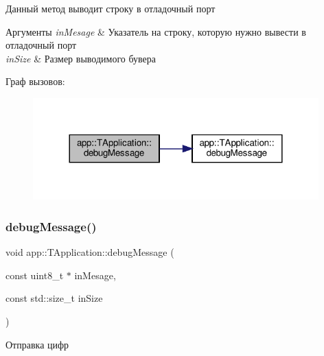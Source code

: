 Данный метод выводит строку в отладочный порт 
\begin{DoxyParams}{Аргументы}
{\em in\+Mesage} & Указатель на строку, которую нужно вывести в отладочный порт \\
\hline
{\em in\+Size} & Размер выводимого бувера \\
\hline
\end{DoxyParams}
Граф вызовов\+:\nopagebreak
\begin{figure}[H]
\begin{center}
\leavevmode
\includegraphics[width=312pt]{classapp_1_1_t_application_ac0c8e394021c1d1ab4163bc8bd8f7b42_cgraph}
\end{center}
\end{figure}
\mbox{\label{classapp_1_1_t_application_a9f4f8b1ef208edca2c5ea5ef1851efca}} 
\subsubsection{\texorpdfstring{debug\+Message()}{debugMessage()}\hspace{0.1cm}{\footnotesize\ttfamily [3/4]}}
{\footnotesize\ttfamily void app\+::\+T\+Application\+::debug\+Message (\begin{DoxyParamCaption}\item[{const uint8\+\_\+t $\ast$}]{in\+Mesage,  }\item[{const std\+::size\+\_\+t}]{in\+Size }\end{DoxyParamCaption})}



Отправка цифр 




